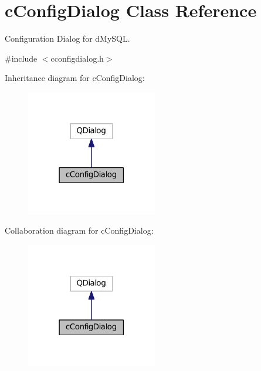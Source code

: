 \hypertarget{classc_config_dialog}{}\section{c\+Config\+Dialog Class Reference}
\label{classc_config_dialog}


Configuration Dialog for d\+My\+S\+QL.  




{\ttfamily \#include $<$cconfigdialog.\+h$>$}



Inheritance diagram for c\+Config\+Dialog\+:
\nopagebreak
\begin{figure}[H]
\begin{center}
\leavevmode
\includegraphics[width=162pt]{classc_config_dialog__inherit__graph}
\end{center}
\end{figure}


Collaboration diagram for c\+Config\+Dialog\+:
\nopagebreak
\begin{figure}[H]
\begin{center}
\leavevmode
\includegraphics[width=162pt]{classc_config_dialog__coll__graph}
\end{center}
\end{figure}
